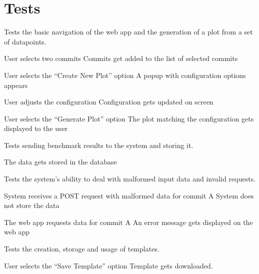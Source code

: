 \section{Tests}


Tests the basic navigation of the web app and the generation of a \gls{plot} from a set of datapoints.

{User selects two commits}
{Commits get added to the list of selected commits}

{User selects the \enquote{Create New Plot} option}
{A popup with configuration options appears}

{User adjusts the configuration}
{Configuration gets updated on screen}

{User selects the \enquote{Generate Plot} option}
{The \gls{plot} matching the configuration gets displayed to the user}


Tests sending \glspl{benchmark result} to the system and storing it.

{The data gets stored in the database}


Tests the system's ability to deal with malformed input data and invalid requests.

{System receives a POST request with malformed data for commit A}
{System does not store the data}

{The web app requests data for commit A}
{An error message gets displayed on the web app}


Tests the creation, storage and usage of templates.

{User selects the \enquote{Save Template} option}
{Template gets downloaded.}

